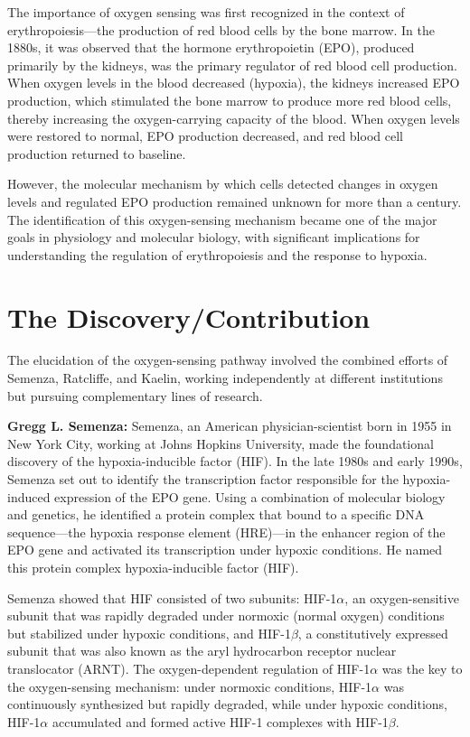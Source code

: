The importance of oxygen sensing was first recognized in the context of erythropoiesis---the production of red blood cells by the bone marrow. In the 1880s, it was observed that the hormone erythropoietin (EPO), produced primarily by the kidneys, was the primary regulator of red blood cell production. When oxygen levels in the blood decreased (hypoxia), the kidneys increased EPO production, which stimulated the bone marrow to produce more red blood cells, thereby increasing the oxygen-carrying capacity of the blood. When oxygen levels were restored to normal, EPO production decreased, and red blood cell production returned to baseline.

However, the molecular mechanism by which cells detected changes in oxygen levels and regulated EPO production remained unknown for more than a century. The identification of this oxygen-sensing mechanism became one of the major goals in physiology and molecular biology, with significant implications for understanding the regulation of erythropoiesis and the response to hypoxia.

\section{The Discovery/Contribution}

The elucidation of the oxygen-sensing pathway involved the combined efforts of Semenza, Ratcliffe, and Kaelin, working independently at different institutions but pursuing complementary lines of research.

\textbf{Gregg L. Semenza:} Semenza, an American physician-scientist born in 1955 in New York City, working at Johns Hopkins University, made the foundational discovery of the hypoxia-inducible factor (HIF). In the late 1980s and early 1990s, Semenza set out to identify the transcription factor responsible for the hypoxia-induced expression of the EPO gene. Using a combination of molecular biology and genetics, he identified a protein complex that bound to a specific DNA sequence---the hypoxia response element (HRE)---in the enhancer region of the EPO gene and activated its transcription under hypoxic conditions. He named this protein complex hypoxia-inducible factor (HIF).

Semenza showed that HIF consisted of two subunits: HIF-1$\alpha$, an oxygen-sensitive subunit that was rapidly degraded under normoxic (normal oxygen) conditions but stabilized under hypoxic conditions, and HIF-1$\beta$, a constitutively expressed subunit that was also known as the aryl hydrocarbon receptor nuclear translocator (ARNT). The oxygen-dependent regulation of HIF-1$\alpha$ was the key to the oxygen-sensing mechanism: under normoxic conditions, HIF-1$\alpha$ was continuously synthesized but rapidly degraded, while under hypoxic conditions, HIF-1$\alpha$ accumulated and formed active HIF-1 complexes with HIF-1$\beta$.


